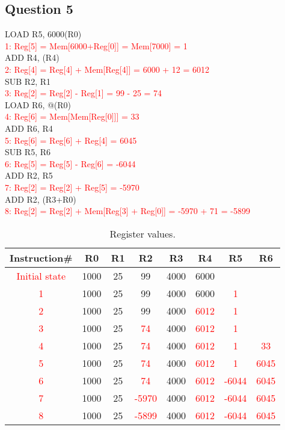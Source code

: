 \documentclass[11pt]{article}
\newcommand{\q}[1]{\subsection*{Question {#1}}}
\newcommand{\answr}[1]{\textcolor{red}{#1}}
\newcommand{\inst}[2]{\textcolor{red}{{#1}{#2}}}
\begin{document}
\q{5}

LOAD R5,  6000(R0) \\
\inst{1}{:} \answr{Reg[5] = Mem[6000+Reg[0]] = Mem[7000] = 1} \\
ADD R4, (R4) \\
\inst{2}{:} \answr{Reg[4] = Reg[4] + Mem[Reg[4]] = 6000 + 12 = 6012} \\
SUB R2, R1 \\
\inst{3}{:} \answr{Reg[2] = Reg[2] - Reg[1] = 99 - 25 = 74} \\
LOAD R6, @(R0) \\
\inst{4}{:} \answr{Reg[6] = Mem[Mem[Reg[0]]] = 33} \\
ADD R6, R4 \\
\inst{5}{:} \answr{Reg[6] = Reg[6] + Reg[4] = 6045} \\
SUB R5, R6 \\
\inst{6}{:} \answr{Reg[5] = Reg[5] - Reg[6] = -6044} \\
ADD R2, R5 \\
\inst{7}{:} \answr{Reg[2] = Reg[2] + Reg[5] = -5970} \\
ADD R2, (R3+R0) \\
\inst{8}{:} \answr{Reg[2] = Reg[2] + Mem[Reg[3] + Reg[0]] = -5970 + 71 = -5899}


\begin{table}[h]
\center
\begin{tabular}{|c|c|c|c|c|c|c|c|}
	\hline
	Instruction\# & R0 & R1 & R2 & R3 & R4 & R5 & R6 \\
	\hline
	\answr{Initial state} & 1000 & 25 & 99 & 4000 & 6000 & & \\
	\hline 
	\inst{1}{} & 1000 & 25 & 99 & 4000 & 6000 & \answr{1} & \\
	\hline
	\inst{2}{} & 1000 & 25 & 99 & 4000 & \answr{6012} & \answr{1} & \\
	\hline
	\inst{3}{} & 1000 & 25 & \answr{74} & 4000 & \answr{6012} & \answr{1} & \\
	\hline
	\inst{4}{} & 1000 & 25 & \answr{74} & 4000 & \answr{6012} & \answr{1} & \answr{33} \\
	\hline
	\inst{5}{} & 1000 & 25 & \answr{74} & 4000 & \answr{6012} & \answr{1} & \answr{6045} \\
	\hline
	\inst{6}{} & 1000 & 25 & \answr{74} & 4000 & \answr{6012} & \answr{-6044} & \answr{6045} \\
	\hline
	\inst{7}{} & 1000 & 25 & \answr{-5970} & 4000 & \answr{6012} & \answr{-6044} & \answr{6045} \\
	\hline
	\inst{8}{} & 1000 & 25 & \answr{-5899} & 4000 & \answr{6012} & \answr{-6044} & \answr{6045} \\
	\hline
\end{tabular}
\caption{Register values.}
\end{table}
\end{document}
